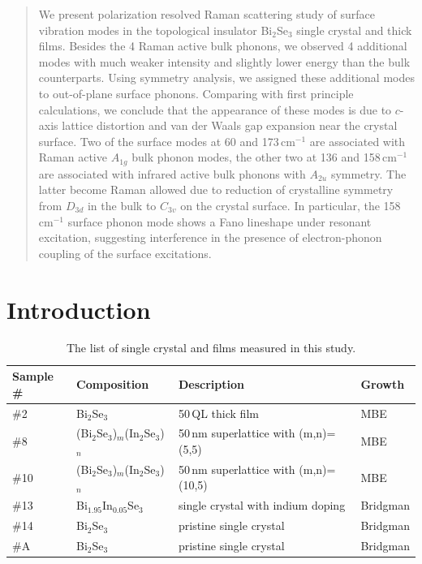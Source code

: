 \documentclass[reprint,aps,pra,superscriptaddress,amsmath,amssymb,linenumbers,longbibliography]{revtex4-1}
\begin{document}
\begin{abstract}
We present polarization resolved Raman scattering study of surface vibration modes in the topological insulator Bi$_2$Se$_3$ single crystal and thick films.
Besides the 4 Raman active bulk phonons, we observed 4 additional modes with much weaker intensity and slightly lower energy than the bulk counterparts.
Using symmetry analysis, we assigned these additional modes to out-of-plane surface phonons. 
Comparing with first principle calculations, we conclude that the appearance of these modes is due to $c$-axis lattice distortion and van der Waals gap expansion near the crystal surface.
Two of the surface modes at 60 and 173\,cm$^{-1}$ are associated with Raman active $A_{1g}$ bulk phonon modes, the other two at 136 and 158\,cm$^{-1}$ are associated with infrared active bulk phonons with $A_{2u}$ symmetry.
The latter become Raman allowed due to reduction of crystalline symmetry from $D_{3d}$ in the bulk to $C_{3v}$ on the crystal surface.
In particular, the 158\,cm$^{-1}$ surface phonon mode shows a Fano lineshape under resonant excitation, suggesting interference in the presence of electron-phonon coupling of the surface excitations.
\end{abstract}
%
\maketitle
%
\section{Introduction}
%
\begin{table}[t]
	\caption{\label{table:sample}The list of single crystal and films measured in this study.}
	\setlength{\tabcolsep}{8pt}
	\setlength{\extrarowheight}{3pt}
	\vspace{5pt}
	\begin{tabular}{l l l l}
		\hline\hline
		Sample\,\# & Composition & Description & Growth\\ 
		\hline
		\#2 & Bi$_2$Se$_3$ & 50\,QL thick film & MBE\\
		\#8 & (Bi$_2$Se$_3$)$_m$(In$_2$Se$_3$)$_n$ & 50\,nm superlattice with (m,n)=(5,5) & MBE\\
		\#10 & (Bi$_2$Se$_3$)$_m$(In$_2$Se$_3$)$_n$ & 50\,nm superlattice with (m,n)=(10,5) & MBE\\
		\#13 & Bi$_{1.95}$In$_{0.05}$Se$_3$ & single crystal with indium doping & Bridgman\\
		\#14 & Bi$_2$Se$_3$ & pristine single crystal & Bridgman\\
		\#A & Bi$_2$Se$_3$ & pristine single crystal & Bridgman\\
		\hline\hline
	\end{tabular} 
\end{table}
\end{document}
